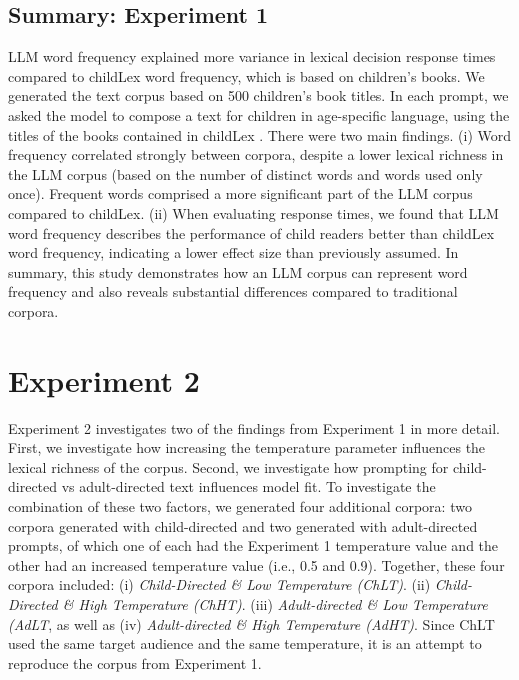 \documentclass[doc, a4paper, anonymous]{apa7}
\begin{document}
\subsection{Summary: Experiment 1}

LLM word frequency explained more variance in lexical decision response times compared to childLex word frequency, which is based on children's books. We generated the text corpus based on 500 children's book titles. In each prompt, we asked the model to compose a text for children in age-specific language, using the titles of the books contained in childLex \citep[][]{schroeder_childlex_2015}. There were two main findings. (i) Word frequency correlated strongly between corpora, despite a lower lexical richness in the LLM corpus (based on the number of distinct words and words used only once). Frequent words comprised a more significant part of the LLM corpus compared to childLex. (ii) When evaluating response times, we found that LLM word frequency describes the performance of child readers better than childLex word frequency, indicating a lower effect size than previously assumed. In summary, this study demonstrates how an LLM corpus can represent word frequency and also reveals substantial differences compared to traditional corpora. 


\section{Experiment 2}

Experiment 2 investigates two of the findings from Experiment 1 in more detail. First, we investigate how increasing the temperature parameter influences the lexical richness of the corpus. Second, we investigate how prompting for child-directed vs adult-directed text influences model fit. To investigate the combination of these two factors, we generated four additional corpora: two corpora generated with child-directed and two generated with adult-directed prompts, of which one of each had the Experiment 1 temperature value and the other had an increased temperature value (i.e., 0.5 and 0.9). Together, these four corpora included: (i) \textit{Child-Directed \& Low Temperature (ChLT)}. (ii) \textit{Child-Directed \& High Temperature (ChHT)}. (iii) \textit{Adult-directed \& Low Temperature (AdLT}, as well as (iv) \textit{Adult-directed \& High Temperature (AdHT)}. Since ChLT used the same target audience and the same temperature, it is an attempt to reproduce the corpus from Experiment 1.
\end{document}
